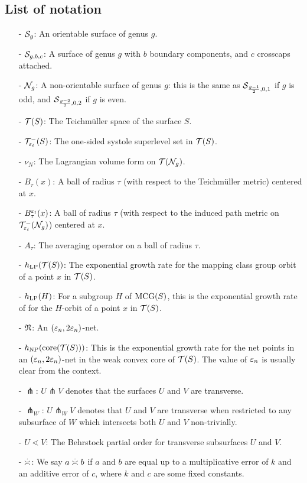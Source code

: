 

\subsection*{List of notation}
\begin{itemize}
\item[-] $\mathcal{S}_g$: An orientable surface of genus $g$.
\item[-] $\mathcal{S}_{g,b,c}$: A surface of genus $g$ with $b$ boundary components, and $c$ crosscaps attached.
\item[-] $\mathcal{N}_g$: A non-orientable surface of genus $g$: this is the same as $\mathcal{S}_{\frac{g-1}{2}, 0, 1}$ if $g$ is odd, and $\mathcal{S}_{\frac{g-2}{2}, 0, 2}$ if $g$ is even.
\item[-] $\mathcal{T}(S)$: The Teichmüller space of the surface $S$.
\item[-] $\mathcal{T}_{\varepsilon_t}^{-}(S)$: The one-sided systole superlevel set in $\mathcal{T}(S)$.
\item[-] $\nu_N$: The Lagrangian volume form on $\mathcal{T}(\mathcal{N}_g)$.
\item[-] $B_{\tau}(x)$: A ball of radius $\tau$ (with respect to the Teichmüller metric) centered at $x$.
\item[-] $B_{\tau}^{\varepsilon_t}(x)$: A ball of radius $\tau$ (with respect to the induced path metric on $\mathcal{T}_{\varepsilon_t}^{-}(\mathcal{N}_g)$) centered at $x$.
\item[-] $A_{\tau}$: The averaging operator on a ball of radius $\tau$.
\item[-] $h_{\mathrm{LP}}(\mathcal{T}(S))$: The exponential growth rate for the mapping class group orbit of a point $x$ in $\mathcal{T}(S)$.
\item[-] $h_{\mathrm{LP}}(H)$: For a subgroup $H$ of $\mathrm{MCG}(S)$, this is the exponential growth rate of for the $H$-orbit of a point $x$ in $\mathcal{T}(S)$.
\item[-] $\mathfrak{N}$: An $(\varepsilon_n, 2\varepsilon_n)$-net.
\item[-] $h_{\mathrm{NP}}(\mathrm{core}(\mathcal{T}(S)))$: This is the exponential growth rate for the net points in an $(\varepsilon_n, 2 \varepsilon_n)$-net in the weak convex core of $\mathcal{T}(S)$. The value of $\varepsilon_n$ is usually clear from the context.
\item[-] $\pitchfork$: $U \pitchfork V$ denotes that the surfaces $U$ and $V$ are transverse.
\item[-] $\pitchfork_{W}$: $U \pitchfork_W V$ denotes that $U$ and $V$ are transverse when restricted to any subsurface of $W$ which intersects both $U$ and $V$ non-trivially.
\item[-] $U \lessdot V$: The Behrstock partial order for transverse subsurfaces $U$ and $V$.
\item[-] $\emul$: We say $a \emul b$ if $a$ and $b$ are equal up to a multiplicative error of $k$ and an additive error of $c$, where $k$ and $c$ are some fixed constants.
\end{itemize}


